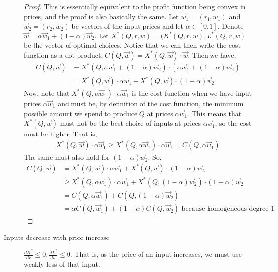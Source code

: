 \begin{description}
    \begin{proof}
    This is essentially equivalent to the profit function being convex in prices, and the proof is also basically the same. Let $\vec{w}_1 = (r_1, w_1)$ and $\vec{w}_2 = (r_2, w_2)$ be vectors of the input prices and let $\alpha \in [0, 1]$. Denote $\vec{w} = \alpha \vec{w}_1 + (1 - \alpha) \vec{w}_2$. Let $X^*(Q, r, w) = (K^*(Q, r, w), L^*(Q, r, w)$ be the vector of optimal choices. Notice that we can then write the cost function as a dot product, $C(Q, \vec{w}) = X^*(Q, \vec{w}) \cdot \vec{w}$. Then we have,
    \begin{align*}
        C(Q, \vec{w}) &= X^*(Q, \alpha \vec{w}_1+ (1 - \alpha) \vec{w}_2) \cdot (\alpha \vec{w}_1+ (1 - \alpha) \vec{w}_2) \\
        &= X^*(Q, \vec{w}) \cdot \alpha \vec{w}_1 + X^*(Q, \vec{w}) \cdot (1 - \alpha) \vec{w}_2
    \end{align*}
    Now, note that $X^*(Q, \alpha \vec{w}_1) \cdot \alpha \vec{w}_1$ is the cost function when we have input prices $\alpha \vec{w}_1$ and must be, by definition of the cost function, the minimum possible amount we spend to produce $Q$ at prices $\alpha \vec{w}_1$. This means that $X^*(Q, \vec{w})$ must not be the best choice of inputs at prices $\alpha \vec{w}_1$, so the cost must be higher. That is, 
    \begin{align*}
        X^*(Q, \vec{w}) \cdot \alpha \vec{w}_1 \geq X^*(Q, \alpha \vec{w}_1) \cdot \alpha \vec{w}_1 = C(Q, \alpha \vec{w}_1)
    \end{align*}
    The same must also hold for $(1 - \alpha) \vec{w}_2$. So,
    \begin{align*}
        C(Q, \vec{w}) &= X^*(Q, \vec{w}) \cdot \alpha \vec{w}_1 + X^*(Q, \vec{w}) \cdot (1 - \alpha) \vec{w}_2 \\
        &\geq X^*(Q, \alpha \vec{w}_1) \cdot \alpha \vec{w}_1 + X^*(Q, (1 - \alpha)\vec{w}_2) \cdot (1 - \alpha)\vec{w}_2 \\
        &= C(Q, \alpha \vec{w}_1) + C(Q, (1 - \alpha) \vec{w}_2) \\
        &= \alpha C(Q, \vec{w}_1) + (1 - \alpha)C(Q, \vec{w}_2) \text{ because homogeneous degree 1}
    \end{align*}
    \end{proof}
    \item[Inputs decrease with price increase] $\frac{dK^*}{dr} \leq 0, \frac{dL^*}{dw} \leq 0$. That is, as the price of an input increases, we must use weakly less of that input.
    

\end{description}
